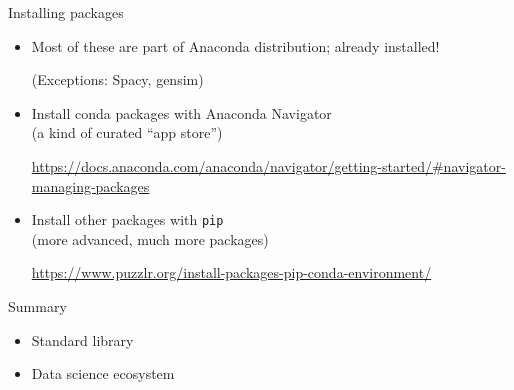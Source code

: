 \documentclass[aspectratio=169,usenames,dvipsnames]{beamer}
\begin{document}
\begin{frame}{Installing packages}
    \begin{itemize}
        \item Most of these are part of Anaconda distribution; already installed!

			(Exceptions: Spacy, gensim)
        \item Install conda packages with Anaconda Navigator \\
			(a kind of curated ``app store'')

            \url{https://docs.anaconda.com/anaconda/navigator/getting-started/\#navigator-managing-packages}

        \item Install other packages with \texttt{pip} \\
			(more advanced, much more packages)

            \url{https://www.puzzlr.org/install-packages-pip-conda-environment/}
    \end{itemize}
\end{frame}


\begin{frame}{Summary}
    \begin{itemize}
        \item Standard library
        \item Data science ecosystem
    \end{itemize}
\end{frame}
\end{document}

